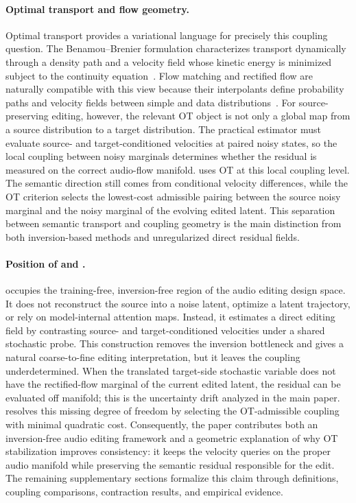 \paragraph{Optimal transport and flow geometry.}
Optimal transport provides a variational language for precisely this coupling question.
The Benamou--Brenier formulation characterizes transport dynamically through a density path and a velocity field whose kinetic energy is minimized subject to the continuity equation~\cite{benamou2000computational,peyre2019computational}.
Flow matching and rectified flow are naturally compatible with this view because their interpolants define probability paths and velocity fields between simple and data distributions~\cite{liu2022flowstraightfastlearning,lipman2023flowmatchinggenerativemodeling}.
For source-preserving editing, however, the relevant OT object is not only a global map from a source distribution to a target distribution.
The practical estimator must evaluate source- and target-conditioned velocities at paired noisy states, so the local coupling between noisy marginals determines whether the residual is measured on the correct audio-flow manifold.
\methodplus uses OT at this local coupling level.
The semantic direction still comes from conditional velocity differences, while the OT criterion selects the lowest-cost admissible pairing between the source noisy marginal and the noisy marginal of the evolving edited latent.
This separation between semantic transport and coupling geometry is the main distinction from both inversion-based methods and unregularized direct residual fields.

\paragraph{Position of \method and \methodplus.}
\method occupies the training-free, inversion-free region of the audio editing design space.
It does not reconstruct the source into a noise latent, optimize a latent trajectory, or rely on model-internal attention maps.
Instead, it estimates a direct editing field by contrasting source- and target-conditioned velocities under a shared stochastic probe.
This construction removes the inversion bottleneck and gives a natural coarse-to-fine editing interpretation, but it leaves the coupling underdetermined.
When the translated target-side stochastic variable does not have the rectified-flow marginal of the current edited latent, the residual can be evaluated off manifold; this is the uncertainty drift analyzed in the main paper.
\methodplus resolves this missing degree of freedom by selecting the OT-admissible coupling with minimal quadratic cost.
Consequently, the paper contributes both an inversion-free audio editing framework and a geometric explanation of why OT stabilization improves consistency: it keeps the velocity queries on the proper audio manifold while preserving the semantic residual responsible for the edit.
The remaining supplementary sections formalize this claim through definitions, coupling comparisons, contraction results, and empirical evidence.

